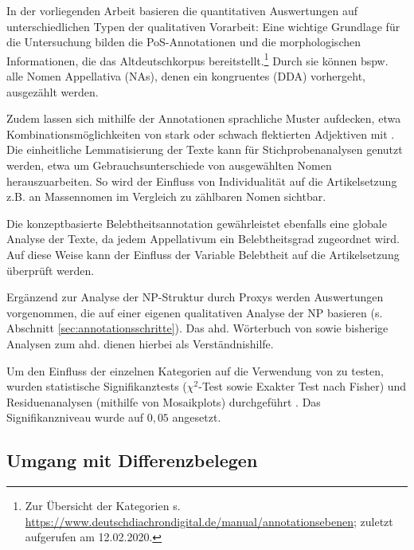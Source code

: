 In der vorliegenden Arbeit basieren die quantitativen Auswertungen auf unterschiedlichen Typen der qualitativen Vorarbeit:
Eine wichtige Grundlage für die Untersuchung bilden die PoS-Annotationen  und die morphologischen Informationen, die das Altdeutschkorpus  bereitstellt.\footnote{Zur Übersicht der Kategorien s. \url{https://www.deutschdiachrondigital.de/manual/annotationsebenen}; zuletzt aufgerufen am 12.02.2020.} Durch sie können bspw. alle Nomen Appellativa (NAs), denen ein kongruentes  (DDA) vorhergeht, ausgezählt werden.

Zudem lassen sich mithilfe der Annotationen  sprachliche Muster aufdecken, etwa Kombinationsmöglichkeiten von stark oder schwach flektierten Adjektiven mit . Die einheitliche  Lemmatisierung der Texte kann für Stichprobenanalysen genutzt werden, etwa um Gebrauchsunterschiede  von ausgewählten Nomen herauszuarbeiten. So wird der Einfluss von Individualität auf die Artikelsetzung z.B. an Massennomen im Vergleich zu zählbaren Nomen sichtbar.

Die konzeptbasierte Belebtheitsannotation  gewährleistet ebenfalls eine globale Analyse der Texte, da jedem Appellativum ein Belebtheitsgrad zugeordnet wird. Auf diese Weise kann der Einfluss der Variable Belebtheit auf die Artikelsetzung überprüft werden. 

Ergänzend zur Analyse der NP-Struktur   durch Proxys werden Auswertungen vorgenommen, die auf einer eigenen qualitativen Analyse der NP  basieren (s. Abschnitt \ref{sec:annotationsschritte}). Das ahd. Wörterbuch von \textcite{Schutzeichel2012} sowie bisherige Analysen zum ahd.  \parencite[v.a.][]{Oubouzar1989} dienen hierbei als Verständnishilfe.  

Um den Einfluss der einzelnen Kategorien auf die Verwendung von  zu testen, wurden statistische Signifikanztests ($\chi^2$-Test sowie Exakter Test nach Fisher) und Residuenanalysen (mithilfe von Mosaikplots) durchgeführt \parencite{Gries2012}. Das Signifikanzniveau wurde auf $0,05$ angesetzt.

\subsection{Umgang mit Differenzbelegen}\label{sec:differenz}

